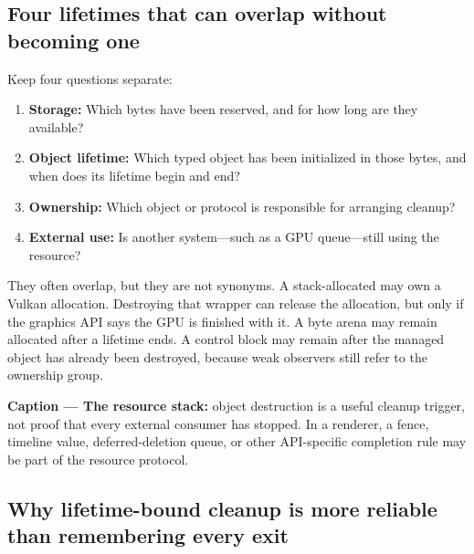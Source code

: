 \subsection{Four lifetimes that can overlap without becoming one}\label{05-engine-i-ch004-four-lifetimes-that-can-overlap-without-becoming-one}

\hypertarget{05-engine-i-ch004-four-lifetimes-that-can-overlap-without-becoming-one}{}

Keep four questions separate:

\begin{enumerate}
\def\labelenumi{\arabic{enumi}.}
\tightlist
\item
  \textbf{Storage:} Which bytes have been reserved, and for how long are they available?
\item
  \textbf{Object lifetime:} Which typed object has been initialized in those bytes, and when does its lifetime begin and end?
\item
  \textbf{Ownership:} Which object or protocol is responsible for arranging cleanup?
\item
  \textbf{External use:} Is another system---such as a GPU queue---still using the resource?
\end{enumerate}

They often overlap, but they are not synonyms. A stack-allocated  may own a Vulkan allocation. Destroying that wrapper can release the allocation, but only if the graphics API says the GPU is finished with it. A byte arena may remain allocated after a  lifetime ends. A  control block may remain after the managed object has already been destroyed, because weak observers still refer to the ownership group.


\textbf{Caption --- The resource stack:} object destruction is a useful cleanup trigger, not proof that every external consumer has stopped. In a renderer, a fence, timeline value, deferred-deletion queue, or other API-specific completion rule may be part of the resource protocol.

\subsection{Why lifetime-bound cleanup is more reliable than remembering every exit}\label{05-engine-i-ch004-why-lifetime-bound-cleanup-is-more-reliable-than-remembering-every-exit}

